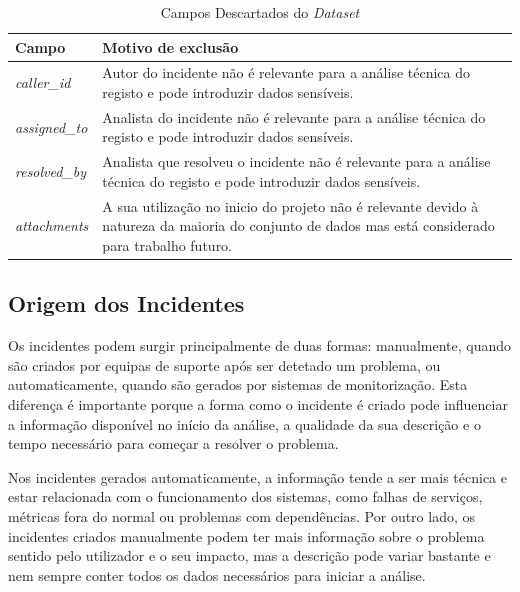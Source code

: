 		\begin{table}[H]
			\centering
			\begin{tabular}{|p{3cm}|p{10cm}|}
				\hline
				\textbf{Campo} & \textbf{Motivo de exclusão} \\
				\hline
				\textit{caller\_id} & Autor do incidente não é relevante para a análise técnica do registo e pode introduzir dados sensíveis. \\
				\hline
				\textit{assigned\_to} &  Analista do incidente não é relevante para a análise técnica do registo e pode introduzir dados sensíveis. \\
				\hline
				\textit{resolved\_by} & Analista que resolveu o incidente não é relevante para a análise técnica do registo e pode introduzir dados sensíveis. \\
				\hline
				\textit{attachments} & A sua utilização no inicio do projeto não é relevante devido à natureza da maioria do conjunto de dados mas está considerado para trabalho futuro. \\
				\hline
			\end{tabular}
			\caption[Campos Descartados do \textit{Dataset}]{Campos Descartados do \textit{Dataset}}
			\label{tab:campos-descartados}
		\end{table}
	
	\subsection{Origem dos Incidentes}
	
		Os incidentes podem surgir principalmente de duas formas: manualmente, quando são criados por equipas de suporte após ser detetado um problema, ou automaticamente, quando são gerados por sistemas de monitorização. Esta diferença é importante porque a forma como o incidente é criado pode influenciar a informação disponível no início da análise, a qualidade da sua descrição e o tempo necessário para começar a resolver o problema.
		
		Nos incidentes gerados automaticamente, a informação tende a ser mais técnica e estar relacionada com o funcionamento dos sistemas, como falhas de serviços, métricas fora do normal ou problemas com dependências. Por outro lado, os incidentes criados manualmente podem ter mais informação sobre o problema sentido pelo utilizador e o seu impacto, mas a descrição pode variar bastante e nem sempre conter todos os dados necessários para iniciar a análise.
		
